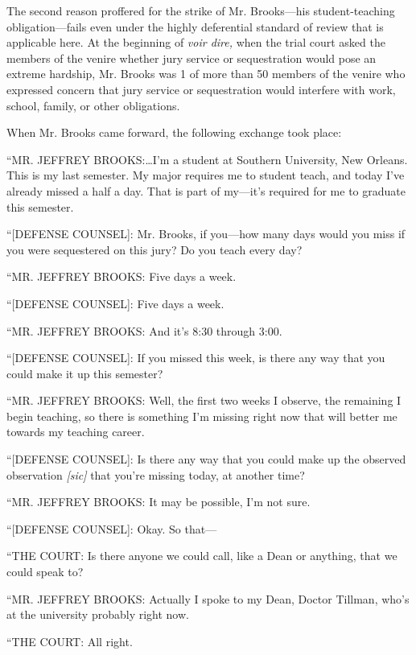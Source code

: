 {  The second reason proffered for the strike of Mr. Brooks---his
student-teaching obligation---fails even under the highly deferential
standard of review that is applicable here. At the beginning of \emph{voir
dire,} when the trial court asked the \newpage  members of the venire
whether jury service or sequestration would pose an extreme hardship,
Mr. Brooks was 1 of more than 50 members of the venire who expressed
concern that jury service or sequestration would interfere with work,
school, family, or other obligations.

  When Mr. Brooks came forward, the following exchange took place:

      ``MR. JEFFREY BROOKS:\dots I'm a student at Southern
    University, New Orleans. This is my last semester. My major requires
    me to student teach, and today I've already missed a half a
    day. That is part of my---it's required for me to graduate this
    semester.

      ``[DEFENSE COUNSEL]: Mr. Brooks, if you---how many days would you
    miss if you were sequestered on this jury? Do you teach every day?

      ``MR. JEFFREY BROOKS: Five days a week.

      ``[DEFENSE COUNSEL]: Five days a week.

      ``MR. JEFFREY BROOKS: And it's 8:30 through 3:00.

      ``[DEFENSE COUNSEL]: If you missed this week, is there any way
    that you could make it up this semester?

      ``MR. JEFFREY BROOKS: Well, the first two weeks I observe, the
    remaining I begin teaching, so there is something I'm missing
    right now that will better me towards my teaching career.

      ``[DEFENSE COUNSEL]: Is there any way that you could make up
    the observed observation \emph{[sic]} that you're missing today, at
    another time?

      ``MR. JEFFREY BROOKS: It may be possible, I'm not sure.

      ``[DEFENSE COUNSEL]: Okay. So that---

      ``THE COURT: Is there anyone we could call, like a Dean or
    anything, that we could speak to?

      ``MR. JEFFREY BROOKS: Actually I spoke to my Dean, Doctor
    Tillman, who's at the university probably right now.

      ``THE COURT: All right.

}

